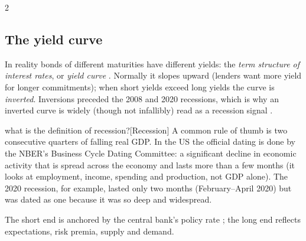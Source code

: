 \begin{paracol}{2}
\subsection{The yield curve}
In reality bonds of different maturities have different yields: the \emph{term structure of
interest rates}, or \emph{yield curve} . Normally it slopes upward (lenders
want more yield for longer commitments); when short yields exceed long yields the curve is
\emph{inverted}. Inversions preceded the 2008 and 2020 recessions, which is why an inverted curve
is widely (though not infallibly) read as a recession signal . \begin{answer}{what is the definition of recession?}[Recession]
A common rule of thumb is two consecutive quarters of falling real GDP. In the US the official
dating is done by the NBER's Business Cycle Dating Committee: a significant decline in economic activity
that is spread across the economy and lasts more than a few months (it looks at employment, income,
spending and production, not GDP alone). The 2020 recession, for example, lasted only two months
(February--April 2020) but was dated as one because it was so deep and widespread.
\end{answer} The short end
is anchored by the central bank's policy rate ; the long end reflects
expectations, risk premia, supply and demand.


\end{paracol}
